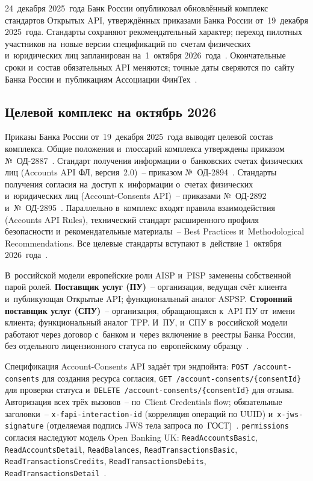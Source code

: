 24~декабря 2025~года Банк России опубликовал обновлённый комплекс
стандартов Открытых API, утверждённых приказами Банка России
от~19~декабря 2025~года. Стандарты сохраняют рекомендательный
характер; переход пилотных участников на~новые версии спецификаций
по~счетам физических и~юридических лиц запланирован на~1~октября
2026~года~\cite{cbr-open-api-update-2025}. Окончательные сроки
и~состав обязательных API меняются; точные даты сверяются
по~сайту Банка России и~публикациям Ассоциации
ФинТех~\cite{cbr-open-api,afe-open-api,openbankingrussia-wiki}.

\subsection*{Целевой комплекс на октябрь 2026}

Приказы Банка России от~19~декабря 2025~года выводят целевой
состав комплекса. Общие положения и~глоссарий комплекса утверждены
приказом №~ОД-2887~\cite{cbr-od-2887}. Стандарт получения информации
о~банковских счетах физических лиц (Accounts API ФЛ, версия~2.0)~--
приказом №~ОД-2894~\cite{cbr-od-2894}. Стандарты получения согласия
на~доступ к~информации о~счетах физических и~юридических лиц
(Account-Consents API)~-- приказами №~ОД-2892
и~№~ОД-2895~\cite{cbr-od-2892,cbr-od-2895}. Параллельно в~комплекс
входят правила взаимодействия (Accounts API Rules), технический
стандарт расширенного профиля безопасности и~рекомендательные
материалы~-- Best Practices и~Methodological Recommendations.
Все целевые стандарты вступают в~действие 1~октября
2026~года~\cite{openbankingrussia-wiki}.

В~российской модели европейские роли AISP и~PISP заменены
собственной парой ролей. \textbf{Поставщик услуг (ПУ)}~-- организация,
ведущая счёт клиента и~публикующая Открытые API; функциональный
аналог ASPSP. \textbf{Сторонний поставщик услуг (СПУ)}~-- организация,
обращающаяся к~API ПУ от~имени клиента; функциональный аналог
TPP. И~ПУ, и~СПУ в~российской модели работают через договор
с~банком и~через включение в~реестры Банка России, без отдельного
лицензионного статуса по~европейскому образцу~\cite{openbankingrussia-wiki}.

Спецификация Account-Consents API задаёт три эндпойнта:
\texttt{POST /account-consents} для создания ресурса согласия,
\texttt{GET /account-consents/\{consentId\}} для проверки статуса
и~\texttt{DELETE /account-consents/\{consentId\}} для отзыва.
Авторизация всех трёх вызовов~-- по~Client Credentials flow;
обязательные заголовки~-- \texttt{x-fapi-interaction-id}
(корреляция операций по UUID) и~\texttt{x-jws-signature} (отделяемая
подпись JWS тела запроса по~ГОСТ)~\cite{cbr-od-2895}.
\texttt{permissions} согласия наследуют модель Open Banking UK:
\texttt{ReadAccountsBasic}, \texttt{ReadAccountsDetail},
\texttt{ReadBalances}, \texttt{ReadTransactionsBasic},
\texttt{ReadTransactionsCredits}, \texttt{ReadTransactionsDebits},
\texttt{ReadTransactionsDetail}~\cite{cbr-od-2895}.

